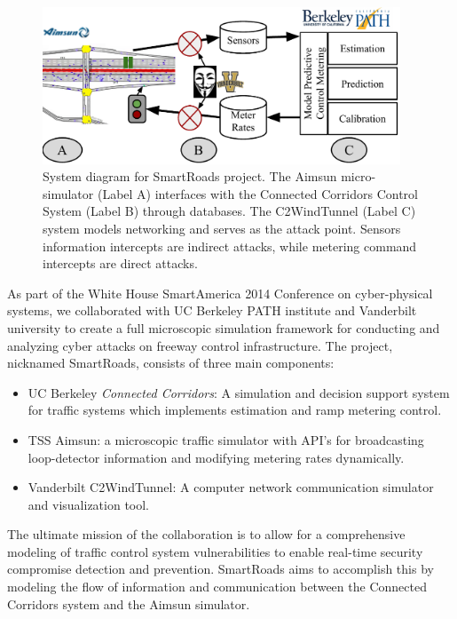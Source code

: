 \begin{figure}[t]
    \centering
    \includegraphics[width=0.95\textwidth]{diagrams/smart-roads}
    \caption[System diagram for SmartRoads project depicting Aimsun microsimulator, Connected Corridors system, and C2WindTunnel software.]{System diagram for SmartRoads project. The Aimsun micro-simulator (Label A) interfaces with the Connected Corridors Control System (Label B) through databases. The C2WindTunnel (Label C) system models networking and serves as the attack point. Sensors information intercepts are indirect attacks, while metering command intercepts are direct attacks.}
    \label{fig:smart-roads-truck}
\end{figure}

As part of the White House SmartAmerica 2014 Conference on cyber-physical systems, we collaborated with UC Berkeley PATH institute and Vanderbilt university to create a full microscopic simulation framework for conducting and analyzing cyber attacks on freeway control infrastructure. The project, nicknamed SmartRoads, consists of three main components:

\begin{itemize}
    \item UC Berkeley \emph{Connected Corridors}: A simulation and decision support system for traffic systems which implements estimation and ramp metering control.
    \item TSS Aimsun: a microscopic traffic simulator with API's for broadcasting loop-detector information and modifying metering rates dynamically.
    \item Vanderbilt C2WindTunnel: A computer network communication simulator and visualization tool.
\end{itemize}

The ultimate mission of the collaboration is to allow for a comprehensive modeling of traffic control system vulnerabilities to enable real-time security compromise detection and prevention. SmartRoads aims to accomplish this by modeling the flow of information and communication between the Connected Corridors system and the Aimsun simulator.

